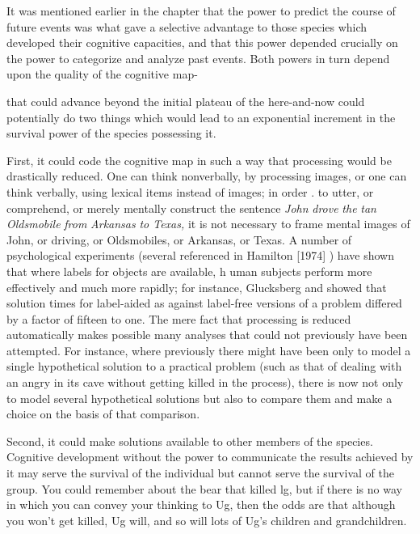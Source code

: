 It was mentioned earlier in the chapter that the power to predict the course of future events was what gave a selective advantage to those species which developed their cognitive capacities, and that this power depended crucially on the power to categorize and analyze past events. Both powers in turn depend upon the quality of the cognitive map-

that could advance beyond the initial plateau of the here-and-now could potentially do two things which would lead to an exponential increment in the survival power of the species possessing it.

First, it could code the cognitive map in such a way that process\-ing  would be drastically reduced. One can think nonverbally, by processing images, or one can think verbally, using lexical items instead of images; in order . to utter, or comprehend, or merely mentally con\-struct the sentence \textit{John} \textit{drove} \textit{the} \textit{tan} \textit{Oldsmobile} \textit{from} \textit{Arkansas} \textit{to Texas,} it is not necessary to frame mental images of John, or driving, or Oldsmobiles, or Arkansas, or Texas. A number of psychological experi\-ments (several referenced in Hamilton [1974] ) have shown that where labels for objects are available, h uman subjects perform more effec\-tively and much more rapidly; for instance, Glucksberg and \citet{Weisberg1966} showed that solution times for label-aided as against label-free versions of a problem differed by a factor of fifteen to one. The mere fact that processing  is reduced automatically makes possible many analyses that could not previously have been attempted. For instance, where previously there might have been only  to model a single
hypothetical solution to a practical problem (such as that of dealing with an angry  in its cave without getting killed in the process), there is now  not only to model several hypothetical solutions but also to compare them and make a choice on the basis of that comparison.

Second, it could make solutions available to other members of the species. Cognitive development without the power to communi\-cate the results achieved by it may serve the survival of the individual but cannot serve the survival of the group. You could remember about the bear that killed lg, but if there is no way in which you can convey your thinking to Ug, then the odds are that although you won't get killed, Ug will, and so will lots of Ug's children and grandchildren.

